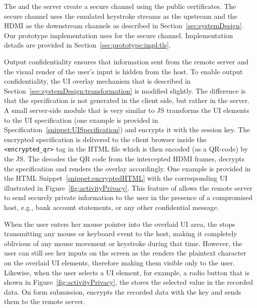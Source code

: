
 The \device and the server create a secure channel using the public certificates. The secure channel uses the emulated keystroke streams as the upstream and the HDMI as the downstream channels as described in Section~\ref{sec:systemDesign}. Our prototype implementation uses \tls for the secure channel. Implementation details are provided in Section~\ref{sec:prototype:impl:tls}. 

 Output confidentiality ensures that information sent from the remote server and the visual render of the user's input is hidden from the host. To enable output confidentiality, the UI overlay mechanism that is described in Section~\ref{sec:systemDesign:transformation} is modified slightly. The difference is that the specification is not generated in the client side, but rather in the server.
A small server-side module that is very similar to \name JS transforms the UI elements to the UI specification (one example is provided in Specification~\ref{snippet:UISpecification}) and encrypts it with the \tls session key. 
The encrypted specification is delivered to the client browser inside the \texttt{<encrypted\_qr>} tag in the HTML file which is then encoded (as a QR-code) by the \name JS. The \device decodes the QR code from the intercepted HDMI frames, decrypts the specification and renders the overlay accordingly. One example is provided in the HTML Snippet~\ref{snippet:encryptedHTML} with the corresponding UI illustrated in Figure~\ref{fig:activityPrivacy}. 
This feature of \name allows the remote server to send securely private information to the user in the presence of a compromised host, e.g., bank account statements, or any other confidential message. 

 When the user enters her mouse pointer into the overlaid UI area, the \device stops transmitting any mouse or keyboard event to the host, making it completely oblivious of any mouse movement or keystroke during that time. 
However, the user can still see her inputs on the screen as the \device renders the plaintext character on the overlaid UI elements, therefore making them visible only to the user.
Likewise, when the user selects a UI element, for example, a radio button that is shown in Figure~\ref{fig:activityPrivacy}, the \device stores the selected value in the recorded data.
On form submission, \device encrypts the recorded data with the \tls key and sends them to the remote server.

